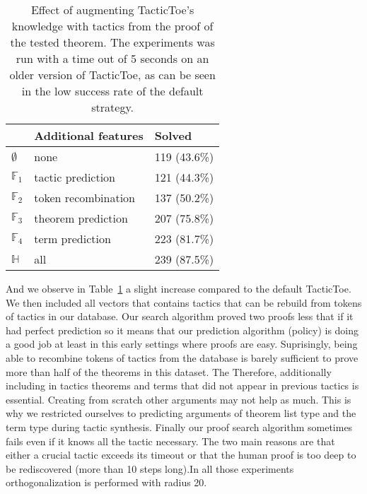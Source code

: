\documentclass[runningheads,a4paper,draft]{svjour3}
\def\tactictoe{\textsf{TacticToe}\xspace}
\newcommand{\ra}[1]{\renewcommand{\arraystretch}{#1}}
\begin{document}
\begin{table}[h]
\centering\ra{1.3}
\small
\begin{tabular}{lll}
\toprule
 & Additional features & Solved \\
\midrule
$\emptyset$   & none & 119 (43.6\%) \\ %
$\mathbb{F}_1$& tactic prediction & 121 (44.3\%) \\ %
$\mathbb{F}_2$& token recombination  & 137 (50.2\%) \\ %
$\mathbb{F}_3$& theorem prediction  & 207 (75.8\%) \\ %
$\mathbb{F}_4$& term prediction & 223 (81.7\%) \\ %
$\mathbb{H}$  & all & 239 (87.5\%) \\ %
\bottomrule
\end{tabular}
\caption{\label{tab:featue_param} Effect of augmenting \tactictoe's knowledge 
with tactics from the proof of the tested theorem. The experiments was run with 
a time out of 5 seconds on an older version of \tactictoe, as can be seen in 
the low 
success rate of the
default strategy.} 
\end{table}


And we observe in Table~\ref{tab:featue_param} a 
slight increase compared to the default \tactictoe. We then included all 
vectors that contains tactics that can be rebuild from tokens of
tactics in our database. 
Our search algorithm proved two proofs less that if it had perfect prediction 
so it means that our prediction algorithm (policy) is doing a good  job at 
least in this early settings where proofs are easy. 
Suprisingly, being able to recombine tokens of tactics from the database is 
barely sufficient to prove more than half of the theorems in this dataset. The 
Therefore, additionally including in tactics theorems and terms that did not 
appear in previous tactics is essential. Creating from scratch other arguments 
may not help as much. This is why we restricted ourselves to predicting 
arguments of theorem list type and the term type during tactic synthesis. 
Finally our proof search algorithm sometimes fails even if it knows all the 
tactic necessary. The two main reasons are that either a crucial tactic 
exceeds its timeout or that the human proof is too deep to be rediscovered 
(more than 10 steps long).In all those experiments orthogonalization is 
performed with 
radius 20.
\end{document}

